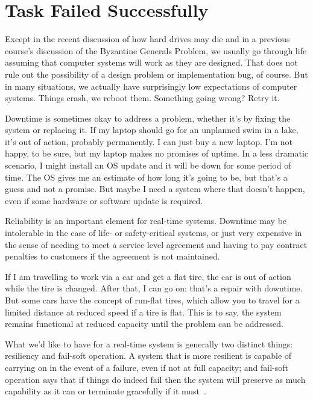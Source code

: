 




\section*{Task Failed Successfully}

Except in the recent discussion of how hard drives may die and in a previous course's discussion of the Byzantine Generals Problem, we usually go through life assuming that computer systems will work as they are designed. That does not rule out the possibility of a design problem or implementation bug, of course. But in many situations, we actually have surprisingly low expectations of computer systems. Things crash, we reboot them. Something going wrong? Retry it.

Downtime is sometimes okay to address a problem, whether it's by fixing the system or replacing it. If my laptop should go for an unplanned swim in a lake, it's out of action, probably permanently. I can just buy a new laptop. I'm not happy, to be sure, but my laptop makes no promises of uptime. In a less dramatic scenario, I might install an OS update and it will be down for some period of time. The OS gives me an estimate of how long it's going to be, but that's a guess and not a promise. But maybe I need a system where that doesn't happen, even if some hardware or software update is required.

Reliability is an important element for real-time systems. Downtime may be intolerable in the case of life- or safety-critical systems, or just very expensive in the sense of needing to meet a service level agreement and having to pay contract penalties to customers if the agreement is not maintained.

If I am travelling to work via a car and get a flat tire, the car is out of action while the tire is changed. After that, I can go on: that's a repair with downtime. But some cars have the concept of run-flat tires, which allow you to travel for a limited distance at reduced speed if a tire is flat. This is to say, the system remains functional at reduced capacity until the problem can be addressed. 

What we'd like to have for a real-time system is generally two distinct things: resiliency and fail-soft operation. A system that is more resilient is capable of carrying on in the event of a failure, even if not at full capacity; and fail-soft operation says that if things do indeed fail then the system will preserve as much capability as it can or terminate gracefully if it must~\cite{osi}. 

